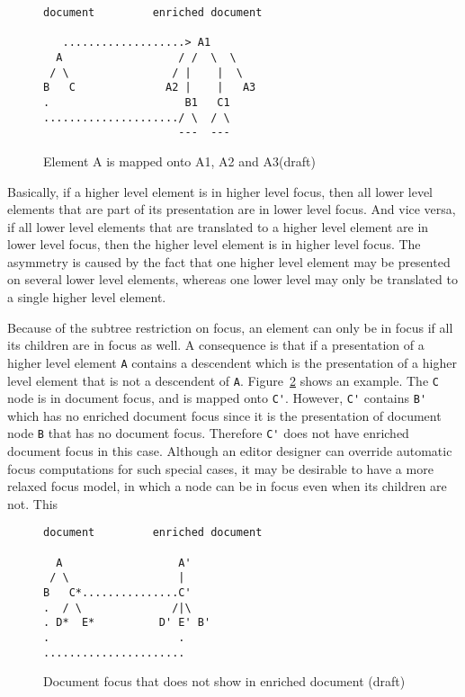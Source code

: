 \begin{figure}
\begin{small}
\begin{center}
\begin{verbatim}
document         enriched document

   ...................> A1
  A                  / /  \  \ 
 / \                / |    |  \ 
B   C              A2 |    |   A3
.                     B1   C1  
...................../ \  / \
                     ---  ---
\end{verbatim}
\caption{Element A is mapped onto A1, A2 and A3(draft)}\label{unpresentableFocus} 
\end{center}
\end{small}
\end{figure}

Basically, if a higher level element is in higher level focus, then all lower level elements that are part of its presentation are in lower level focus. And vice versa, if all lower level elements that are translated to a higher level element are in lower level focus, then the higher level element is in higher level focus. The asymmetry is caused by the fact that one higher level element may be presented on several lower level elements, whereas one lower level may only be translated to a single higher level element.

Because of the subtree restriction on focus, an element can only be in focus if all its children are in focus as well.  A consequence is that if a presentation of a higher level element \verb|A| contains a descendent which is the presentation of a higher level element that is not a descendent of \verb|A|. Figure~\ref{unpresentableFocus} shows an example. The \verb|C| node is in document focus, and is mapped onto \verb|C'|. However, \verb|C'| contains \verb|B'| which has no enriched document focus since it is the presentation of document node \verb|B| that has no document focus. Therefore \verb|C'| does not have enriched document focus in this case. Although an editor designer can override automatic focus computations for such special cases, it may be desirable to have a more relaxed focus model, in which a node can be in focus even when its children are not. This 


\begin{figure}
\begin{small}
\begin{center}
\begin{verbatim}
document         enriched document

  A                  A'
 / \                 |
B   C*...............C'
.  / \              /|\
. D*  E*          D' E' B'
.                    .
......................    
\end{verbatim}
\caption{Document focus that does not show in enriched document (draft)}\label{unpresentableFocus} 
\end{center}
\end{small}
\end{figure}


